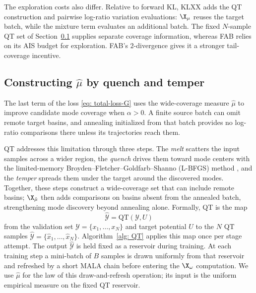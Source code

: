 \documentclass{article}
\begin{document}
The exploration costs also differ. Relative to forward KL, KLXX adds the QT construction and pairwise log-ratio variation evaluations: $\X_\mu$ reuses the target batch, while the mixture term evaluates an additional batch. The fixed $N$-sample QT set of Section~\ref{subsec: QT} supplies separate coverage information, whereas FAB relies on its AIS budget for exploration. FAB's $2$-divergence gives it a stronger tail-coverage incentive.

\subsection{Constructing \texorpdfstring{$\hat\mu$}{mu-hat} by quench and temper}
\label{subsec: QT}

The last term of the loss \eqref{eq: total-loss-G} uses the wide-coverage measure $\hat\mu$ to improve candidate mode coverage when $\alpha>0$. A finite source batch can omit remote target basins, and annealing initialized from that batch provides no log-ratio comparisons there unless its trajectories reach them.

QT addresses this limitation through three steps. The \emph{melt} scatters the input samples across a wider region, the \emph{quench} drives them toward mode centers with the limited-memory Broyden--Fletcher--Goldfarb--Shanno (L-BFGS) method \citep{liu1989limited}, and the \emph{temper} spreads them under the target around the discovered modes. Together, these steps construct a wide-coverage set that can include remote basins; $\X_{\hat\mu}$ then adds comparisons on basins absent from the annealed batch, strengthening mode discovery beyond annealing alone. Formally, QT is the map
\begin{equation*}
    \hat{\mathcal Y} = \mathrm{QT}(\mathcal Y,U)
\end{equation*}
from the validation set $\mathcal Y=\{x_1,\dots,x_N\}$ and target potential $U$ to the $N$ QT samples $\hat{\mathcal Y}=\{\hat x_1,\dots,\hat x_N\}$. Algorithm~\ref{alg: QT} applies this map once per stage attempt. The output $\hat{\mathcal Y}$ is held fixed as a reservoir during training. At each training step a mini-batch of $B$ samples is drawn uniformly from that reservoir and refreshed by a short MALA chain before entering the $\X_\omega$ computation. We use $\hat\mu$ for the law of this draw-and-refresh operation; its input is the uniform empirical measure on the fixed QT reservoir.
\end{document}
